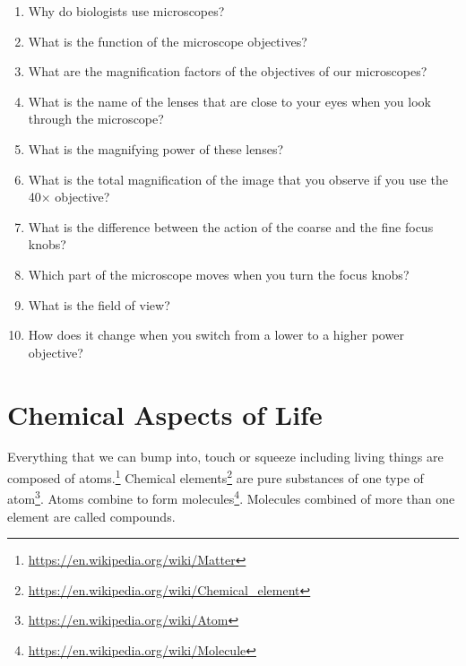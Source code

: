 \documentclass[]{book}
\providecommand{\tightlist}{%
  \setlength{\itemsep}{0pt}\setlength{\parskip}{0pt}}
\let\rmarkdownfootnote\footnote%
\def\footnote{\protect\rmarkdownfootnote}
\renewcommand{\href}[2]{#2\footnote{\url{#1}}}
\begin{document}
\begin{enumerate}
\def\labelenumi{\arabic{enumi}.}
\tightlist
\item
  Why do biologists use microscopes?
\item
  What is the function of the microscope objectives?
\item
  What are the magnification factors of the objectives of our microscopes?
\item
  What is the name of the lenses that are close to your eyes when you look through the microscope?
\item
  What is the magnifying power of these lenses?
\item
  What is the total magnification of the image that you observe if you use the 40× objective?
\item
  What is the difference between the action of the coarse and the fine focus knobs?
\item
  Which part of the microscope moves when you turn the focus knobs?
\item
  What is the field of view?
\item
  How does it change when you switch from a lower to a higher power objective?
\end{enumerate}

\hypertarget{chemical-aspects-of-life}{%
\chapter{Chemical Aspects of Life}\label{chemical-aspects-of-life}}

\href{https://en.wikipedia.org/wiki/Matter}{Everything that we can bump into, touch or squeeze including living things are composed of atoms.} \href{https://en.wikipedia.org/wiki/Chemical_element}{Chemical elements} are pure substances of one type of \href{https://en.wikipedia.org/wiki/Atom}{atom}. Atoms combine to form \href{https://en.wikipedia.org/wiki/Molecule}{molecules}. Molecules combined of more than one element are called compounds.
\end{document}
